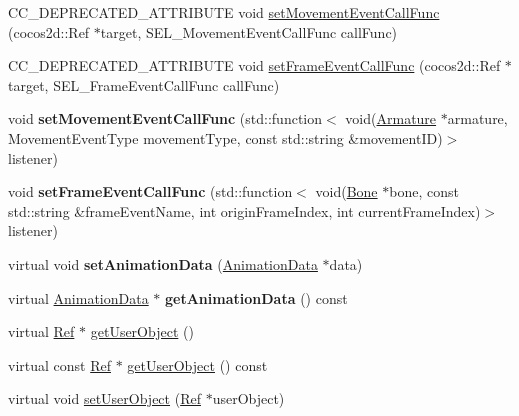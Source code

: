 \begin{DoxyCompactItemize}
\item 
C\+C\+\_\+\+D\+E\+P\+R\+E\+C\+A\+T\+E\+D\+\_\+\+A\+T\+T\+R\+I\+B\+U\+TE void \hyperlink{classcocostudio_1_1ArmatureAnimation_a5b4f25c5dfd203bcea77d00922270281}{set\+Movement\+Event\+Call\+Func} (cocos2d\+::\+Ref $\ast$target, S\+E\+L\+\_\+\+Movement\+Event\+Call\+Func call\+Func)
\item 
C\+C\+\_\+\+D\+E\+P\+R\+E\+C\+A\+T\+E\+D\+\_\+\+A\+T\+T\+R\+I\+B\+U\+TE void \hyperlink{classcocostudio_1_1ArmatureAnimation_a646b072a0805d3067cdffaa0df2bec47}{set\+Frame\+Event\+Call\+Func} (cocos2d\+::\+Ref $\ast$target, S\+E\+L\+\_\+\+Frame\+Event\+Call\+Func call\+Func)
\item 
\mbox{\label{classcocostudio_1_1ArmatureAnimation_ae6d7150507e035e4b186c85cad6b5ded}} 
void {\bfseries set\+Movement\+Event\+Call\+Func} (std\+::function$<$ void(\hyperlink{classcocostudio_1_1Armature}{Armature} $\ast$armature, Movement\+Event\+Type movement\+Type, const std\+::string \&movement\+ID)$>$ listener)
\item 
\mbox{\label{classcocostudio_1_1ArmatureAnimation_a4951994d728c836fd91be4d5f5febc7e}} 
void {\bfseries set\+Frame\+Event\+Call\+Func} (std\+::function$<$ void(\hyperlink{classcocostudio_1_1Bone}{Bone} $\ast$bone, const std\+::string \&frame\+Event\+Name, int origin\+Frame\+Index, int current\+Frame\+Index)$>$ listener)
\item 
\mbox{\label{classcocostudio_1_1ArmatureAnimation_a7b55c27d62201984c6fe6b4cee285705}} 
virtual void {\bfseries set\+Animation\+Data} (\hyperlink{classcocostudio_1_1AnimationData}{Animation\+Data} $\ast$data)
\item 
\mbox{\label{classcocostudio_1_1ArmatureAnimation_a0473f0b6a8b44e12a2f137eb7f35cbff}} 
virtual \hyperlink{classcocostudio_1_1AnimationData}{Animation\+Data} $\ast$ {\bfseries get\+Animation\+Data} () const
\item 
virtual \hyperlink{classRef}{Ref} $\ast$ \hyperlink{classcocostudio_1_1ArmatureAnimation_a6fa92be3b8b72d379d70ef642328507c}{get\+User\+Object} ()
\item 
virtual const \hyperlink{classRef}{Ref} $\ast$ \hyperlink{classcocostudio_1_1ArmatureAnimation_a8ac8a61a26989e520fb828af003ff0c1}{get\+User\+Object} () const
\item 
virtual void \hyperlink{classcocostudio_1_1ArmatureAnimation_a418ce11bc98bab3a4c008aa2a0147536}{set\+User\+Object} (\hyperlink{classRef}{Ref} $\ast$user\+Object)
\end{DoxyCompactItemize}
